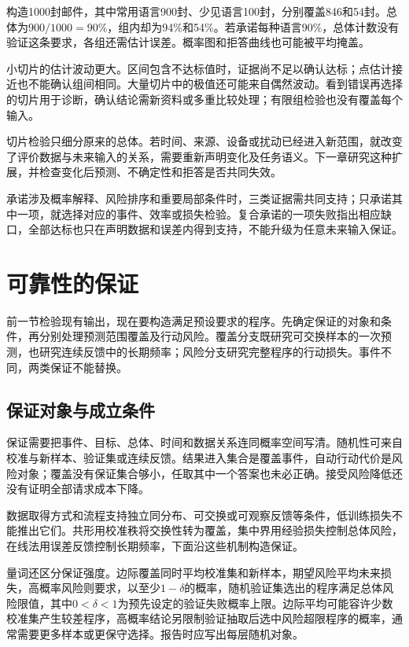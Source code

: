 构造1000封邮件，其中常用语言900封、少见语言100封，分别覆盖846和54封。总体为$900/1000=90\%$，组内却为94\%和54\%。若承诺每种语言90\%，总体计数没有验证这条要求，各组还需估计误差。概率图和拒答曲线也可能被平均掩盖。

小切片的估计波动更大。区间包含不达标值时，证据尚不足以确认达标；点估计接近也不能确认组间相同。大量切片中的极值还可能来自偶然波动。看到错误再选择的切片用于诊断，确认结论需新资料或多重比较处理；有限组检验也没有覆盖每个输入。

切片检验只细分原来的总体。若时间、来源、设备或扰动已经进入新范围，就改变了评价数据与未来输入的关系，需要重新声明变化及任务语义。下一章研究这种扩展，并检查变化后预测、不确定性和拒答是否共同失效。

承诺涉及概率解释、风险排序和重要局部条件时，三类证据需共同支持；只承诺其中一项，就选择对应的事件、效率或损失检验。复合承诺的一项失败指出相应缺口，全部达标也只在声明数据和误差内得到支持，不能升级为任意未来输入保证。

\section{可靠性的保证}
\label{sec:reliability-guarantee}

前一节检验现有输出，现在要构造满足预设要求的程序。先确定保证的对象和条件，再分别处理预测范围覆盖及行动风险。覆盖分支既研究可交换样本的一次预测，也研究连续反馈中的长期频率；风险分支研究完整程序的行动损失。事件不同，两类保证不能替换。

\subsection{保证对象与成立条件}

保证需要把事件、目标、总体、时间和数据关系连同概率空间写清。随机性可来自校准与新样本、验证集或连续反馈。结果进入集合是覆盖事件，自动行动代价是风险对象；覆盖没有保证集合够小，任取其中一个答案也未必正确。接受风险降低还没有证明全部请求成本下降。

数据取得方式和流程支持独立同分布、可交换或可观察反馈等条件，低训练损失不能推出它们。共形用校准秩将交换性转为覆盖，集中界用经验损失控制总体风险，在线法用误差反馈控制长期频率，下面沿这些机制构造保证。

量词还区分保证强度。边际覆盖同时平均校准集和新样本，期望风险平均未来损失，高概率风险则要求，以至少$1-\delta$的概率，随机验证集选出的程序满足总体风险限值，其中$0<\delta<1$为预先设定的验证失败概率上限。边际平均可能容许少数校准集产生较差程序，高概率结论另限制验证抽取后选中风险超限程序的概率，通常需要更多样本或更保守选择。报告时应写出每层随机对象。

